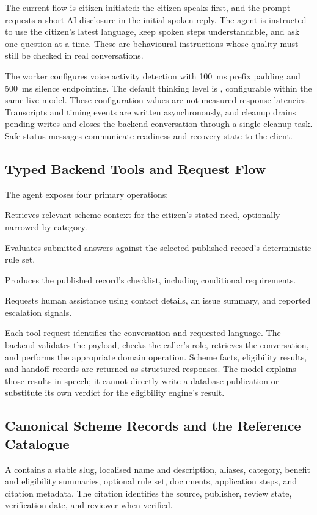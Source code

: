 \documentclass[11pt,a4paper,oneside]{report}
\newcommand{\code}[1]{\texttt{\detokenize{#1}}}
\begin{document}
The current flow is citizen-initiated: the citizen speaks first, and the prompt
requests a short AI disclosure in the initial spoken reply. The agent is instructed
to use the citizen's latest language, keep spoken steps understandable, and ask one
question at a time. These are behavioural instructions whose quality must still be
checked in real conversations.

The worker configures voice activity detection with 100~ms prefix padding and
500~ms silence endpointing. The default thinking level is \code{low}, configurable
within the same live model. These configuration values are not measured response
latencies. Transcripts and timing events are written asynchronously, and cleanup
drains pending writes and closes the backend conversation through a single cleanup
task. Safe status messages communicate readiness and recovery state to the client.

\subsection{Typed Backend Tools and Request Flow}
The agent exposes four primary operations:
\begin{description}[leftmargin=1.7em,style=nextline]
  \item[\code{find_service}] Retrieves relevant scheme context for the citizen's
    stated need, optionally narrowed by category.
  \item[\code{check_eligibility}] Evaluates submitted answers against the selected
    published record's deterministic rule set.
  \item[\code{get_documents}] Produces the published record's checklist, including
    conditional requirements.
  \item[\code{request_handoff}] Requests human assistance using contact details,
    an issue summary, and reported escalation signals.
\end{description}

Each tool request identifies the conversation and requested language. The backend
validates the payload, checks the caller's role, retrieves the conversation, and
performs the appropriate domain operation. Scheme facts, eligibility results,
and handoff records are returned as structured responses. The model explains
those results in speech; it cannot directly write a database publication or
substitute its own verdict for the eligibility engine's result.

\subsection{Canonical Scheme Records and the Reference Catalogue}
A \code{ServiceRecord} contains a stable slug, localised name and description,
aliases, category, benefit and eligibility summaries, optional rule set,
documents, application steps, and citation metadata. The citation identifies the
source, publisher, review state, verification date, and reviewer when verified.
\end{document}
